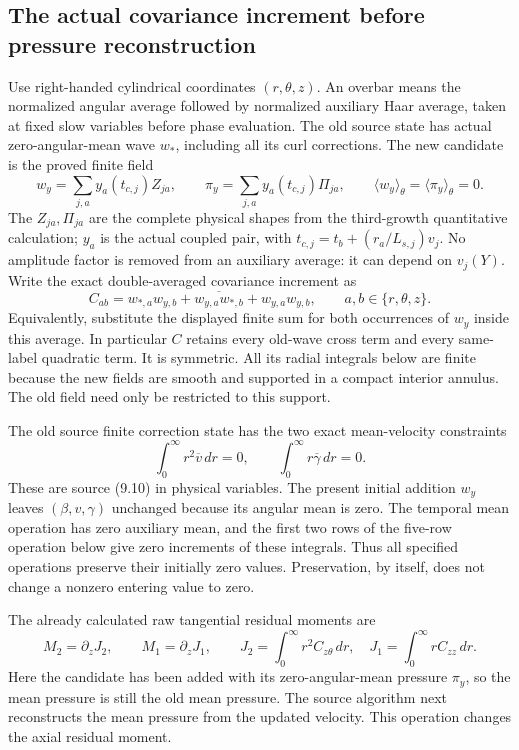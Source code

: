 \documentclass[11pt]{article}
\begin{document}
\subsection{The actual covariance increment before pressure reconstruction}

Use right-handed cylindrical coordinates $(r,\theta,z)$. An overbar
means the normalized angular average followed by normalized auxiliary
Haar average, taken at fixed slow variables before phase evaluation.
The old source state has actual zero-angular-mean wave $w_*$, including
all its curl corrections. The new candidate is the proved finite field
\[
 w_y=\sum_{j,a}y_a(t_{c,j})Z_{ja},\qquad
 \pi_y=\sum_{j,a}y_a(t_{c,j})\Pi_{ja},\qquad
 \langle w_y\rangle_\theta=\langle\pi_y\rangle_\theta=0.
\]
The $Z_{ja},\Pi_{ja}$ are the complete physical shapes from the
third-growth quantitative calculation; $y_a$ is the actual coupled
pair, with $t_{c,j}=t_b+(r_a/L_{s,j})v_j$. No amplitude factor is
removed from an auxiliary average: it can depend on $v_j(Y)$.
Write the exact double-averaged covariance increment as
\begin{equation}\label{momop:C}
 C_{ab}=
 \overline{w_{*,a}w_{y,b}+w_{y,a}w_{*,b}+w_{y,a}w_{y,b}},
 \qquad a,b\in\{r,\theta,z\}.
\end{equation}
Equivalently, substitute the displayed finite sum for both occurrences
of $w_y$ inside this average. In particular $C$ retains every old-wave
cross term and every same-label quadratic term. It is symmetric.
All its radial integrals below are finite because the new fields are
smooth and supported in a compact interior annulus. The old field
need only be restricted to this support.

The old source finite correction state has the two exact mean-velocity
constraints
\[
 \int_0^\infty r^2\overline v\,dr=0,\qquad
 \int_0^\infty r\overline\gamma\,dr=0 .
\]
These are source (9.10) in physical variables. The present initial
addition $w_y$ leaves $(\beta,v,\gamma)$ unchanged because its angular
mean is zero. The temporal mean operation has zero auxiliary mean,
and the first two rows of the five-row operation below give zero
increments of these integrals. Thus all specified operations preserve
their initially zero values. Preservation, by itself, does not change
a nonzero entering value to zero.

The already calculated raw tangential residual moments are
\[
 M_2=\partial_zJ_2,\qquad M_1=\partial_zJ_1,\qquad
 J_2=\int_0^\infty r^2C_{z\theta}\,dr,\quad
 J_1=\int_0^\infty rC_{zz}\,dr.
\]
Here the candidate has been added with its zero-angular-mean pressure
$\pi_y$, so the mean pressure is still the old mean pressure.
The source algorithm next reconstructs the mean pressure from the
updated velocity. This operation changes the axial residual moment.
\end{document}
